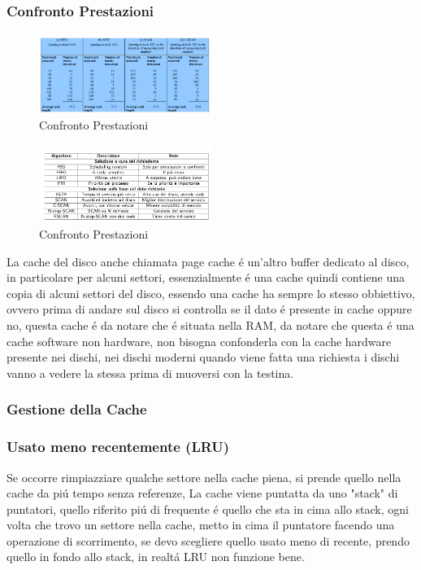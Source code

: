 \subsubsection*{Confronto Prestazioni}
\begin{figure}[H]
    \centering
    \includegraphics[width=0.5\textwidth]{immagini/ConfrontoSchedulingHDD}
    \caption{Confronto Prestazioni}
\end{figure}
\begin{figure}[H]
    \centering
    \includegraphics[width=0.5\textwidth]{immagini/RiassuntoAlgoritmiHDD}
    \caption{Confronto Prestazioni}
\end{figure}
La cache del disco anche chiamata page cache é un'altro buffer dedicato al disco, in particolare per alcuni settori,
essenzialmente é una cache quindi contiene una copia di alcuni settori del disco, essendo una cache ha sempre
lo stesso obbiettivo, ovvero prima di andare sul disco si controlla se il dato é presente in cache oppure no, questa
cache é da notare che é situata nella RAM, da notare che questa é una cache software non hardware, non bisogna confonderla
con la cache hardware presente nei dischi, nei dischi moderni quando viene fatta una richiesta i dischi vanno a vedere
la stessa prima di muoversi con la testina.
\subsubsection{Gestione della Cache}
\subsubsection*{Usato meno recentemente (LRU)}
Se occorre rimpiazziare qualche settore nella cache piena, si prende quello nella cache da piú tempo senza referenze,
La cache viene puntatta da uno "stack" di puntatori, quello riferito piú di frequente é quello che sta in cima allo stack,
ogni volta che trovo un settore nella cache, metto in cima il puntatore facendo una operazione di scorrimento, se devo
scegliere quello usato meno di recente, prendo quello in fondo allo stack, in realtá LRU non funzione bene.
